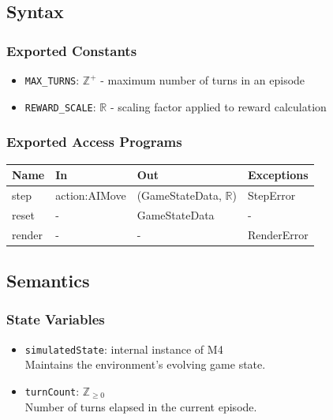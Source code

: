 \documentclass[12pt, titlepage]{article}
\begin{document}
\subsection{Syntax}

\subsubsection{Exported Constants}
\begin{itemize}
\item \texttt{MAX\_TURNS}: $\mathbb{Z}^{+}$ - maximum number of turns in an episode
\item \texttt{REWARD\_SCALE}: $\mathbb{R}$ - scaling factor applied to reward calculation
\end{itemize}

\subsubsection{Exported Access Programs}
\begin{center}
\begin{tabular}{p{5cm} p{4cm} p{4cm} p{3cm}}
\hline
\textbf{Name} & \textbf{In} & \textbf{Out} & \textbf{Exceptions} \\
\hline
step & action:AIMove & (GameStateData, $\mathbb{R}$) & StepError \\
reset & - & GameStateData & - \\
render & - & - & RenderError \\
\hline
\end{tabular}
\end{center}

\subsection{Semantics}

\subsubsection{State Variables}
\begin{itemize}
\item \texttt{simulatedState}: internal instance of M4 \\
      Maintains the environment's evolving game state.

\item \texttt{turnCount}: $\mathbb{Z}_{\ge 0}$ \\
      Number of turns elapsed in the current episode.
\end{itemize}
\end{document}
